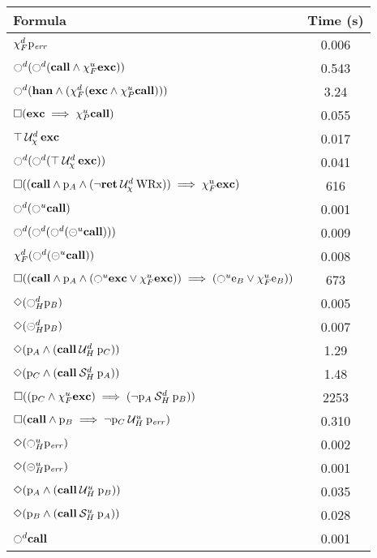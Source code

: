 \documentclass{article}
\begin{document}
\begin{table}
\centering
\begin{tabular}{| l | c |}
\hline
Formula & Time (s) \\
\hline
\hline
$\chi_F^{d} \mathrm{p}_\mathit{err}$ & 0.006 \\
$\ocircle^d (\ocircle^d (\mathbf{call} \land \chi_F^{u} \mathbf{exc}))$ & 0.543 \\
$\ocircle^d (\mathbf{han} \land (\chi_F^{d} (\mathbf{exc} \land \chi_P^{u} \mathbf{call})))$ & 3.24 \\
$\square (\mathbf{exc} \implies \chi_P^{u} \mathbf{call})$ & 0.055 \\
${\top} \mathbin{\mathcal{U}_\chi^d} {\mathbf{exc}}$ & 0.017 \\
$\ocircle^d (\ocircle^d ({\top} \mathbin{\mathcal{U}_\chi^d} {\mathbf{exc}}))$ & 0.041 \\
$\square ((\mathbf{call} \land \mathrm{p}_A \land ({\neg \mathbf{ret}} \mathbin{\mathcal{U}_\chi^d} {\mathrm{WRx}})) \implies \chi_F^{u} \mathbf{exc})$ & 616 \\
$\ocircle^d (\ocircle^u \mathbf{call})$ & 0.001 \\
$\ocircle^d (\ocircle^d (\ocircle^d (\circleddash^u \mathbf{call})))$ & 0.009 \\
$\chi_F^{d} (\ocircle^d (\circleddash^u \mathbf{call}))$ & 0.008 \\
$\square ((\mathbf{call} \land \mathrm{p}_A \land (\ocircle^u \mathbf{exc} \lor \chi_F^{u} \mathbf{exc})) \implies (\ocircle^u \mathrm{e}_B \lor \chi_F^{u} \mathrm{e}_B))$ & 673 \\
$\Diamond (\ocircle_H^{d} \mathrm{p}_B)$ & 0.005 \\
$\Diamond (\circleddash_H^{d} \mathrm{p}_B)$ & 0.007 \\
$\Diamond (\mathrm{p}_A \land ({\mathbf{call}} \mathbin{\mathcal{U}_H^d} {\mathrm{p}_C}))$ & 1.29 \\
$\Diamond (\mathrm{p}_C \land ({\mathbf{call}} \mathbin{\mathcal{S}_H^d} {\mathrm{p}_A}))$ & 1.48 \\
$\square ((\mathrm{p}_C \land \chi_F^{u} \mathbf{exc}) \implies ({\neg \mathrm{p}_A} \mathbin{\mathcal{S}_H^d} {\mathrm{p}_B}))$ & 2253 \\
$\square (\mathbf{call} \land \mathrm{p}_B \implies {\neg \mathrm{p}_C} \mathbin{\mathcal{U}_H^u} {\mathrm{p}_\mathit{err}})$ & 0.310 \\
$\Diamond (\ocircle_H^{u} \mathrm{p}_\mathit{err})$ & 0.002 \\
$\Diamond (\circleddash_H^{u} \mathrm{p}_\mathit{err})$ & 0.001 \\
$\Diamond (\mathrm{p}_A \land ({\mathbf{call}} \mathbin{\mathcal{U}_H^u} {\mathrm{p}_B}))$ & 0.035 \\
$\Diamond (\mathrm{p}_B \land ({\mathbf{call}} \mathbin{\mathcal{S}_H^u} {\mathrm{p}_A}))$ & 0.028 \\
$\ocircle^d \mathbf{call}$ & 0.001 \\

\end{tabular}
\end{table}
\end{document}
